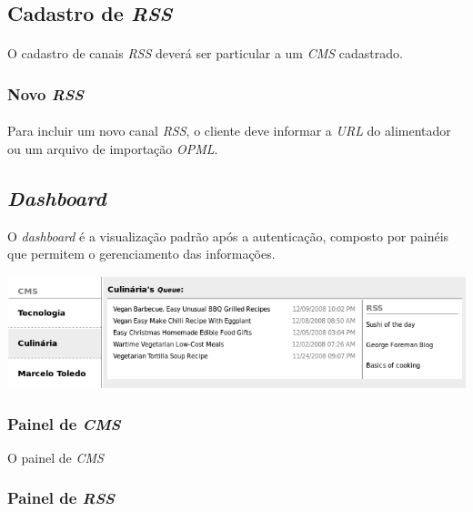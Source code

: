 \documentclass[a4paper,12pt]{article}
\def\cms{\emph{CMS}}
\def\rss{\emph{RSS}}
\def\url{\emph{URL}}
\begin{document}

\subsection{Cadastro de \rss{}}

\paragraph{}
O cadastro de canais \rss{} deverá ser particular a um \cms{} cadastrado.


\subsubsection{Novo \rss{}}

\paragraph{}
Para incluir um novo canal \rss{}, o cliente deve informar a \url{} do
alimentador ou um arquivo de importação \emph{OPML}.

\subsection{\emph{Dashboard}}

O \emph{dashboard} é a visualização padrão após a autenticação, composto por
painéis que permitem o gerenciamento das informações. 

\begin{center}
\includegraphics[scale=0.5]{dashboard.png}
\end{center}

\subsubsection{Painel de \cms{}}

O painel de \cms{} 

\subsubsection{Painel de \rss{}}
\end{document}
